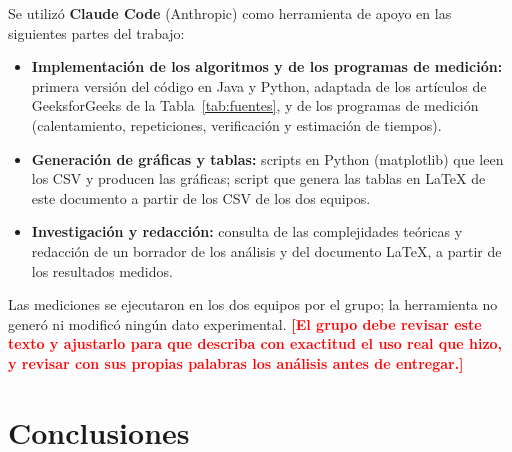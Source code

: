 \documentclass[11pt,a4paper]{article}
\newcommand{\pendiente}[1]{\textcolor{red}{\textbf{[#1]}}}
\begin{document}
Se utiliz\'o \textbf{Claude Code} (Anthropic) como herramienta de apoyo en las siguientes partes del trabajo:
\begin{itemize}
  \item \textbf{Implementaci\'on de los algoritmos y de los programas de medici\'on:} primera versi\'on del c\'odigo
  en Java y Python, adaptada de los art\'iculos de GeeksforGeeks de la Tabla~\ref{tab:fuentes}, y de los
  programas de medici\'on (calentamiento, repeticiones, verificaci\'on y estimaci\'on de tiempos).
  \item \textbf{Generaci\'on de gr\'aficas y tablas:} scripts en Python (matplotlib) que leen los CSV y
  producen las gr\'aficas; script que genera las tablas en \LaTeX{} de este documento a partir de los CSV de los
  dos equipos.
  \item \textbf{Investigaci\'on y redacci\'on:} consulta de las complejidades te\'oricas y redacci\'on de un
  borrador de los an\'alisis y del documento \LaTeX{}, a partir de los resultados medidos.
\end{itemize}
Las mediciones se ejecutaron en los dos equipos por el grupo; la herramienta no gener\'o ni modific\'o ning\'un
dato experimental. \pendiente{El grupo debe revisar este texto y ajustarlo para que describa con exactitud
el uso real que hizo, y revisar con sus propias palabras los an\'alisis antes de entregar.}

\section{Conclusiones}
\end{document}
